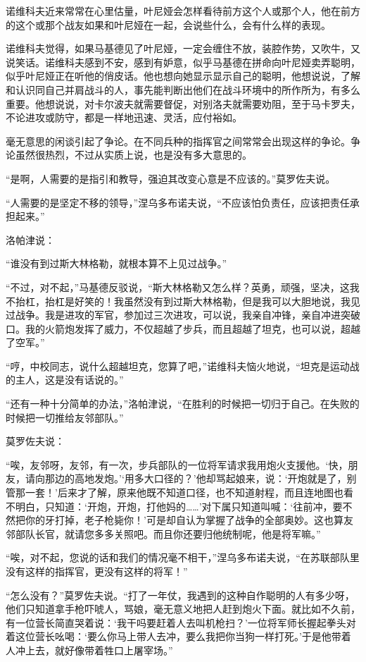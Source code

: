 诺维科夫近来常常在心里估量，叶尼娅会怎样看待前方这个人或那个人，他在前方的这个或那个战友如果和叶尼娅在一起，会说些什么，会有什么样的表现。

诺维科夫觉得，如果马基德见了叶尼娅，一定会缠住不放，装腔作势，又吹牛，又说笑话。诺维科夫感到不安，感到有妒意，似乎马基德在拼命向叶尼娅卖弄聪明，似乎叶尼娅正在听他的俏皮话。他也想向她显示显示自己的聪明，他想说说，了解和认识同自己并肩战斗的人，事先能判断出他们在战斗环境中的所作所为，有多么重要。他想说说，对卡尔波夫就需要督促，对别洛夫就需要劝阻，至于马卡罗夫，不论进攻或防守，都是一样地迅速、灵活，应付裕如。

毫无意思的闲谈引起了争论。在不同兵种的指挥官之间常常会出现这样的争论。争论虽然很热烈，不过从实质上说，也是没有多大意思的。

“是啊，人需要的是指引和教导，强迫其改变心意是不应该的。”莫罗佐夫说。

“人需要的是坚定不移的领导，”涅乌多布诺夫说，“不应该怕负责任，应该把责任承担起来。”

洛帕津说：

“谁没有到过斯大林格勒，就根本算不上见过战争。”

“不过，对不起，”马基德反驳说，“斯大林格勒又怎么样？英勇，顽强，坚决，这我不抬杠，抬杠是好笑的！我虽然没有到过斯大林格勒，但是我可以大胆地说，我见过战争。我是进攻的军官，参加过三次进攻，可以说，我亲自冲锋，亲自冲进突破口。我的火箭炮发挥了威力，不仅超越了步兵，而且超越了坦克，也可以说，超越了空军。”

“哼，中校同志，说什么超越坦克，您算了吧，”诺维科夫恼火地说，“坦克是运动战的主人，这是没有话说的。”

“还有一种十分简单的办法，”洛帕津说，“在胜利的时候把一切归于自己。在失败的时候把一切推给友邻部队。”

莫罗佐夫说：

“唉，友邻呀，友邻，有一次，步兵部队的一位将军请求我用炮火支援他。‘快，朋友，请向那边的高地发炮。’‘用多大口径的？’他却骂起娘来，说：‘开炮就是了，别管那一套！’后来才了解，原来他既不知道口径，也不知道射程，而且连地图也看不明白，只知道：‘开炮，开炮，打他妈的……’对下属只知道叫喊：‘往前冲，要不然把你的牙打掉，老子枪毙你！’可是却自认为掌握了战争的全部奥妙。这也算友邻部队长官，就请您多多关照吧。而且你还要归他统制呢，他是将军嘛。”

“唉，对不起，您说的话和我们的情况毫不相干，”涅乌多布诺夫说，“在苏联部队里没有这样的指挥官，更没有这样的将军！”

“怎么没有？”莫罗佐夫说。“打了一年仗，我遇到的这种自作聪明的人有多少呀，他们只知道拿手枪吓唬人，骂娘，毫无意义地把人赶到炮火下面。就比如不久前，有一位营长简直哭着说：‘我干吗要赶着人去叫机枪扫？’一位将军师长握起拳头对着这位营长吆喝：‘要么你马上带人去冲，要么我把你当狗一样打死。’于是他带着人冲上去，就好像带着牲口上屠宰场。”

